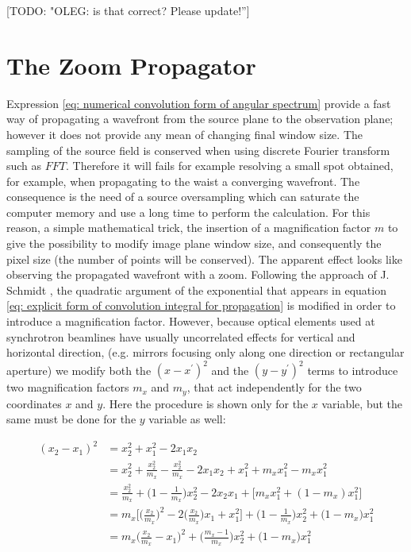 \documentclass{iucr}              %
\newcommand{\todo}[1]{{\color{red}[TODO: "#1'']}}
\begin{document}
\todo{OLEG: is that correct? Please update!}


\section{The Zoom Propagator}
\label{appendix_zoom}

Expression \ref{eq: numerical convolution form of angular spectrum} provide a fast way of propagating a wavefront from the source plane to the observation plane; however it does not provide any mean of changing final window size. The sampling of the source field is conserved when using discrete Fourier transform such as $FFT$. Therefore it will fails for example resolving a small spot obtained, for example, when propagating to the waist a converging wavefront. The consequence is the need of a source oversampling which can saturate the computer memory and use a long time to perform the calculation. For this reason, a simple mathematical trick, the insertion of a magnification factor $m$ to give the possibility to modify image plane window size, and consequently the pixel size (the number of points will be conserved). The apparent effect looks like observing the propagated wavefront with a zoom. Following the approach of J. Schmidt \cite{schmidt}, the quadratic argument of the exponential that appears in equation \ref{eq: explicit form of convolution integral for propagation} is modified in order to introduce a magnification factor. However, because optical elements used at synchrotron beamlines have usually uncorrelated effects for vertical and horizontal direction, (e.g. mirrors focusing only along one direction or rectangular aperture) we modify both the $(x - x^\prime)^2$ and the $(y - y^\prime)^2$ terms to introduce two magnification factors $m_x$ and $m_y$, that act independently for the two coordinates $x$ and $y$. Here the procedure is shown only for the $x$ variable, but the same must be done for the $y$ variable as well: 

\begin{align}\label{eq:introduction of m factor}
(x_2 - x_1)^2 &= x_2^2 + x_1^2 -2 x_1 x_2 \nonumber \\
&=x_2^2 + \frac{x_2^2}{m_x} - \frac{x_2^2}{m_x} - 2 x_1 x_2 + x_1^2 + m_x x_1^2 - m_x x_1^2 \nonumber\\
&=\frac {x_2^2}{m_x} + \Big ( 1- \frac{1}{m_x}\Big) x_2^2 -2 x_2 x_1 + \Big [m_x x_1^2 + (1- m_x) x_1^2 \Big] \nonumber\\
&=m_x \Big [\Big(\frac{x_2}{m_x}\Big)^2 - 2 \Big( \frac{x_2}{m_x} \Big)x_1 + x_1^2\Big] + \Big(1-\frac{1}{m_x}\Big)x_2^2 + \Big(1-m_x\Big)x_1^2 \nonumber\\
&=m_x \Big (\frac{x_2}{m_x}-x_1\Big)^2 + \Big (\frac{m_x - 1}{m_x}\Big)x_2^2 + \Big(1-m_x\Big)x_1^2
\end{align}
\end{document}
